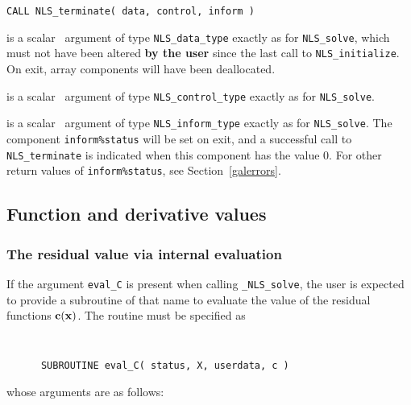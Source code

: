 \documentclass{galahad}
\newcommand{\packagename}{NLS}
\newcommand{\fullpackagename}{\libraryname\_\packagename}
\newcommand{\solver}{{\tt \fullpackagename\_solve}}
\begin{document}
\hspace{8mm}
{\tt CALL \packagename\_terminate( data, control, inform )}

\vspace*{-1mm}
\begin{description}

 is a scalar \intentinout\ argument of type
{\tt \packagename\_data\_type}
exactly as for
{\tt \packagename\_solve},
which must not have been altered {\bf by the user} since the last call to
{\tt \packagename\_initialize}.
On exit, array components will have been deallocated.

 is a scalar \intentin\ argument of type
{\tt \packagename\_control\_type}
exactly as for
{\tt \packagename\_solve}.

 is a scalar \intentout\ argument of type
{\tt \packagename\_inform\_type}
exactly as for
{\tt \packagename\_solve}.
The component {\tt inform\%status} will be set on exit, and a
successful call to
{\tt \packagename\_terminate}
is indicated when this  component has the value 0.
For other return values of {\tt inform\%status}, see Section~\ref{galerrors}.

\end{description}


\subsection{Function and derivative values\label{fdv}}


\subsubsection{The residual value via internal evaluation\label{rfv}}

If the argument {\tt eval\_C} is present when calling \solver, the
user is expected to provide a subroutine of that name to evaluate the
value of the residual functions ${\mathbf{c}}({\mathbf{x}})$.
The routine must be specified as

\def\baselinestretch{0.8}
{\tt
\begin{verbatim}
      SUBROUTINE eval_C( status, X, userdata, c )
\end{verbatim}
}
\def\baselinestretch{1.0}
\noindent whose arguments are as follows:
\end{document}
